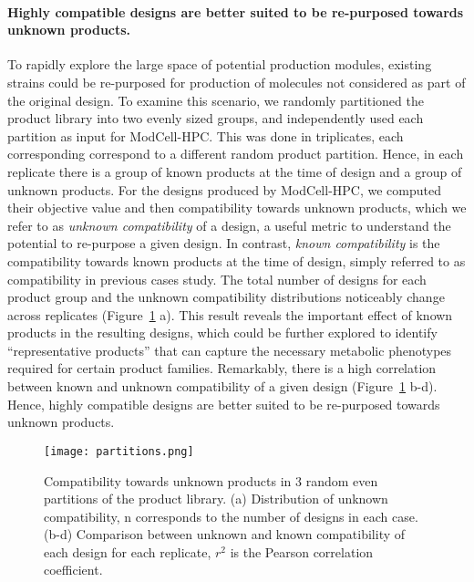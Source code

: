 {\paragraph{Highly compatible designs are better suited to be re-purposed towards unknown products.}
To rapidly explore the large space of potential production modules, existing strains could be re-purposed for production of molecules not considered as part of the original design.
To examine this scenario,  we randomly partitioned the product library into two evenly sized groups, and independently used each partition as input for ModCell-HPC.
This was done in triplicates, each corresponding correspond to a different random product partition.
Hence, in each replicate there is a group of known products at the time of design and a group of unknown products. For the designs produced by ModCell-HPC, we computed their objective value and then compatibility towards unknown products, which we refer to as \emph{unknown compatibility} of a design, a useful metric to understand the potential to re-purpose a given design.
In contrast, \emph{known compatibility} is the compatibility towards known products at the time of design, simply referred to as compatibility in previous cases study.
The total number of designs for each product group and the unknown compatibility distributions noticeably change across replicates (Figure~\ref{fig7:partitions} a).
This result reveals the important effect of known products in the resulting designs, which could be further explored to identify ``representative products'' that can capture the necessary metabolic phenotypes required for certain product families.
Remarkably, there is a high correlation between known and unknown compatibility
of a given design (Figure~\ref{fig7:partitions} b-d).
Hence, highly compatible designs are better suited to be re-purposed towards unknown products.

\begin{figure}[h]
    \centering
    \texttt{[image: partitions.png]}
    \caption[Compatibility towards unknown products in 3 random even partitions]{Compatibility towards unknown products in 3 random even partitions of the product library. (a) Distribution of unknown compatibility, n corresponds to the number of designs in each case. (b-d) Comparison between unknown and known compatibility of each design for each replicate, $r^2$ is the Pearson correlation coefficient.}
    \label{fig7:partitions}
\end{figure}

}
